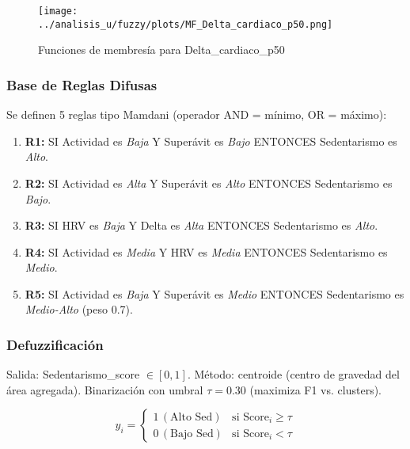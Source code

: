 \documentclass[12pt,a4paper,twoside]{article}
\begin{document}
\begin{figure}[h]
\centering
\texttt{[image: ../analisis\_u/fuzzy/plots/MF\_Delta\_cardiaco\_p50.png]}
\caption{Funciones de membresía para Delta\_cardiaco\_p50}
\label{fig:mf_delta}
\end{figure}

\subsubsection{Base de Reglas Difusas}

Se definen 5 reglas tipo Mamdani (operador AND = mínimo, OR = máximo):

\begin{enumerate}
    \item \textbf{R1:} SI Actividad es \textit{Baja} Y Superávit es \textit{Bajo} ENTONCES Sedentarismo es \textit{Alto}.
    \item \textbf{R2:} SI Actividad es \textit{Alta} Y Superávit es \textit{Alto} ENTONCES Sedentarismo es \textit{Bajo}.
    \item \textbf{R3:} SI HRV es \textit{Baja} Y Delta es \textit{Alta} ENTONCES Sedentarismo es \textit{Alto}.
    \item \textbf{R4:} SI Actividad es \textit{Media} Y HRV es \textit{Media} ENTONCES Sedentarismo es \textit{Medio}.
    \item \textbf{R5:} SI Actividad es \textit{Baja} Y Superávit es \textit{Medio} ENTONCES Sedentarismo es \textit{Medio-Alto} (peso 0.7).
\end{enumerate}

\subsubsection{Defuzzificación}

Salida: Sedentarismo\_score $\in [0, 1]$. Método: centroide (centro de gravedad del área agregada). Binarización con umbral $\tau=0.30$ (maximiza F1 vs. clusters).

\begin{equation}
\hat{y}_i = \begin{cases} 1 \, (\text{Alto Sed}) & \text{si Score}_i \geq \tau \\ 0 \, (\text{Bajo Sed}) & \text{si Score}_i < \tau \end{cases}
\end{equation}

\end{document}
